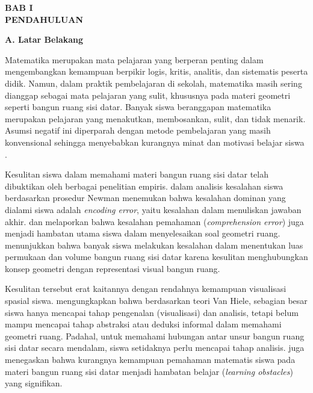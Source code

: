 \begin{center}
    \textbf{BAB I}\\
    \textbf{PENDAHULUAN}
\end{center}

\textbf{A. Latar Belakang}

\hspace*{1cm}Matematika merupakan mata pelajaran yang berperan penting dalam mengembangkan kemampuan berpikir logis, kritis, analitis, dan sistematis peserta didik. Namun, dalam praktik pembelajaran di sekolah, matematika masih sering dianggap sebagai mata pelajaran yang sulit, khususnya pada materi geometri seperti bangun ruang sisi datar. Banyak siswa beranggapan matematika merupakan pelajaran yang menakutkan, membosankan, sulit, dan tidak menarik. Asumsi negatif ini diperparah dengan metode pembelajaran yang masih konvensional sehingga menyebabkan kurangnya minat dan motivasi belajar siswa \citep{pulungan2022}.

\hspace*{1cm}Kesulitan siswa dalam memahami materi bangun ruang sisi datar telah dibuktikan oleh berbagai penelitian empiris. \citet{darmawan2018} dalam analisis kesalahan siswa berdasarkan prosedur Newman menemukan bahwa kesalahan dominan yang dialami siswa adalah \textit{encoding error}, yaitu kesalahan dalam menuliskan jawaban akhir. \citet{lestari2018} dan \citet{hendrayanto2021} melaporkan bahwa kesalahan pemahaman (\textit{comprehension error}) juga menjadi hambatan utama siswa dalam menyelesaikan soal geometri ruang. \citet{putra2022} menunjukkan bahwa banyak siswa melakukan kesalahan dalam menentukan luas permukaan dan volume bangun ruang sisi datar karena kesulitan menghubungkan konsep geometri dengan representasi visual bangun ruang.

\hspace*{1cm}Kesulitan tersebut erat kaitannya dengan rendahnya kemampuan visualisasi spasial siswa. \citet{tarlina2024} mengungkapkan bahwa berdasarkan teori Van Hiele, sebagian besar siswa hanya mencapai tahap pengenalan (visualisasi) dan analisis, tetapi belum mampu mencapai tahap abstraksi atau deduksi informal dalam memahami geometri ruang. Padahal, untuk memahami hubungan antar unsur bangun ruang sisi datar secara mendalam, siswa setidaknya perlu mencapai tahap analisis. \citet{bahiyah2022} juga menegaskan bahwa kurangnya kemampuan pemahaman matematis siswa pada materi bangun ruang sisi datar menjadi hambatan belajar (\textit{learning obstacles}) yang signifikan.

